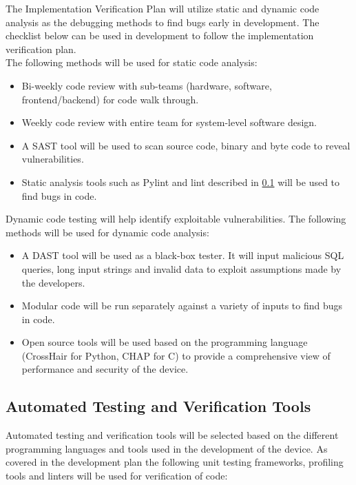 \documentclass[12pt, titlepage]{article}
\begin{document}
The Implementation Verification Plan will utilize static and dynamic code analysis as the debugging methods to find bugs early in development. The checklist below can be used in development to follow the implementation verification plan.\\
The following methods will be used for static code analysis:
\begin{itemize}
  \item Bi-weekly code review with sub-teams (hardware, software, frontend/backend) for code walk through.
  \item Weekly code review with entire team for system-level software design.
  \item A SAST tool will be used to scan source code, binary and byte code to reveal vulnerabilities.
  \item Static analysis tools such as Pylint and lint described in \ref{Automation} will be used to find bugs in code.
\end{itemize}
Dynamic code testing will help identify exploitable vulnerabilities. The following methods will be used for dynamic code analysis:
\begin{itemize}
  \item A DAST tool will be used as a black-box tester. It will input malicious SQL queries, long input strings and invalid data to exploit assumptions made by the developers.
  \item Modular code will  be run separately against a variety of inputs to find bugs in code.
  \item Open source tools will be used based on the programming language (CrossHair for Python, CHAP for C) to provide a comprehensive view of performance and security of the device.
\end{itemize}


\subsection{Automated Testing and Verification Tools}\label{Automation}

Automated testing and verification tools will be selected based on the different programming languages and tools used in the development of the device. As covered in the development plan \cite{Development_Plan} the following unit testing frameworks, profiling tools and linters will be used for verification of code:
\end{document}
